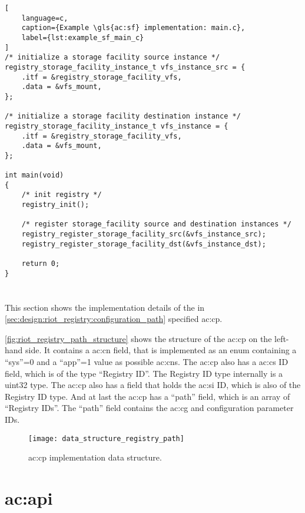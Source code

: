 {\begin{lstlisting}[
    language=c,
    caption={Example \gls{ac:sf} implementation: main.c},
    label={lst:example_sf_main_c}
]
/* initialize a storage facility source instance */
registry_storage_facility_instance_t vfs_instance_src = {
    .itf = &registry_storage_facility_vfs,
    .data = &vfs_mount,
};

/* initialize a storage facility destination instance */
registry_storage_facility_instance_t vfs_instance = {
    .itf = &registry_storage_facility_vfs,
    .data = &vfs_mount,
};

int main(void)
{
    /* init registry */
    registry_init();

    /* register storage_facility source and destination instances */
    registry_register_storage_facility_src(&vfs_instance_src);
    registry_register_storage_facility_dst(&vfs_instance_dst);

    return 0;
}
\end{lstlisting}

\section{}

This section shows the implementation details of the in \autoref{sec:design:riot_registry:configuration_path} specified \gls{ac:cp}.

\autoref{fig:riot_registry_path_structure} shows the structure of the \gls{ac:cp} on the left-hand side.
It contains a \gls{ac:cn} field, that is implemented as an enum containing a ``sys''=0 and a ``app''=1 value as possible \glspl{ac:cn}.
The \gls{ac:cp} also has a \gls{ac:cs} ID field, which is of the type ``Registry ID''.
The Registry ID type internally is a uint32 type.
The \gls{ac:cp} also has a field that holds the \gls{ac:si} ID, which is also of the Registry ID type.
And at last the \gls{ac:cp} has a ``path'' field, which is an array of ``Registry IDs''.
The ``path'' field contains the \gls{ac:cg} and configuration parameter IDs.

\begin{figure}[H]
    \centering
    \texttt{[image: data\_structure\_registry\_path]}
    \caption{ \gls{ac:cp} implementation data structure.}
    \label{fig:riot_registry_path_structure}
\end{figure}

\section{\gls*{ac:api}}
\label{sec:implementation:riot_registry_api}

}
